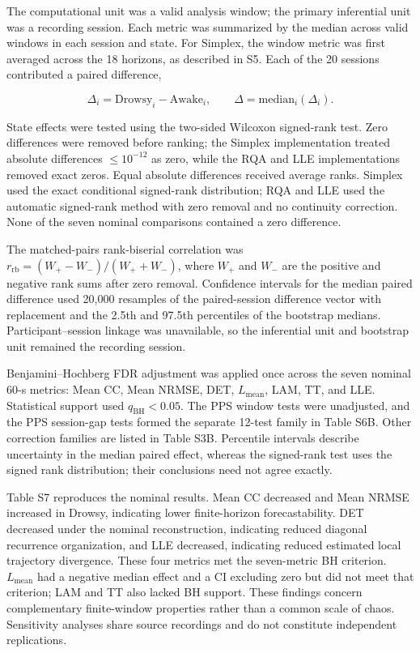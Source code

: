 The computational unit was a valid analysis window; the primary inferential unit was a recording session. Each metric was summarized by the median across valid windows in each session and state. For Simplex, the window metric was first averaged across the 18 horizons, as described in S5. Each of the 20 sessions contributed a paired difference,

\[
\Delta_i=\mathrm{Drowsy}_i-\mathrm{Awake}_i,\qquad \Delta=\mathrm{median}_i(\Delta_i).
\]

State effects were tested using the two-sided Wilcoxon signed-rank test. Zero differences were removed before ranking; the Simplex implementation treated absolute differences $\leq10^{-12}$ as zero, while the RQA and LLE implementations removed exact zeros. Equal absolute differences received average ranks. Simplex used the exact conditional signed-rank distribution; RQA and LLE used the automatic signed-rank method with zero removal and no continuity correction. None of the seven nominal comparisons contained a zero difference.

The matched-pairs rank-biserial correlation was $r_{\mathrm{rb}}=(W_+-W_-)/(W_++W_-)$, where $W_+$ and $W_-$ are the positive and negative rank sums after zero removal. Confidence intervals for the median paired difference used 20,000 resamples of the paired-session difference vector with replacement and the 2.5th and 97.5th percentiles of the bootstrap medians. Participant--session linkage was unavailable, so the inferential unit and bootstrap unit remained the recording session.

Benjamini--Hochberg FDR adjustment was applied once across the seven nominal 60-s metrics: Mean CC, Mean NRMSE, DET, $L_{\mathrm{mean}}$, LAM, TT, and LLE. Statistical support used $q_{\mathrm{BH}}<0.05$. The PPS window tests were unadjusted, and the PPS session-gap tests formed the separate 12-test family in Table S6B. Other correction families are listed in Table S3B. Percentile intervals describe uncertainty in the median paired effect, whereas the signed-rank test uses the signed rank distribution; their conclusions need not agree exactly.

Table S7 reproduces the nominal results. Mean CC decreased and Mean NRMSE increased in Drowsy, indicating lower finite-horizon forecastability. DET decreased under the nominal reconstruction, indicating reduced diagonal recurrence organization, and LLE decreased, indicating reduced estimated local trajectory divergence. These four metrics met the seven-metric BH criterion. $L_{\mathrm{mean}}$ had a negative median effect and a CI excluding zero but did not meet that criterion; LAM and TT also lacked BH support. These findings concern complementary finite-window properties rather than a common scale of chaos. Sensitivity analyses share source recordings and do not constitute independent replications.

